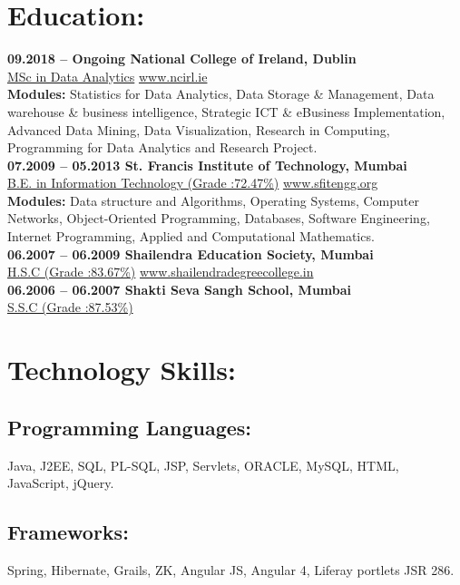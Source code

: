 \documentclass{article}
\begin{document}
\section{Education:}
\textbf{09.2018 – Ongoing \hfill National College of Ireland, Dublin\\}
\underline{MSc in Data Analytics} \hfill \href{www.ncirl.ie}{www.ncirl.ie}\\
\textbf{Modules:} Statistics for Data Analytics, Data Storage \& Management, Data warehouse \& business intelligence, Strategic ICT \& eBusiness Implementation, Advanced Data Mining, Data Visualization, Research in Computing, Programming for Data Analytics and Research Project.\hfill\\
\linebreak
\textbf{07.2009 – 05.2013 \hfill St. Francis Institute of Technology, Mumbai\\}
\underline{B.E. in Information Technology (Grade :72.47\%)} \hfill \href{www.sfitengg.org}{www.sfitengg.org} \\
\textbf{Modules:} Data structure and Algorithms, Operating Systems, Computer Networks, Object-Oriented Programming, Databases, Software Engineering, Internet Programming, Applied and Computational Mathematics.\hfill\\
\linebreak
\textbf{06.2007 – 06.2009 \hfill Shailendra Education Society, Mumbai \\}
\underline{H.S.C (Grade :83.67\%)} \hfill \href{www.shailendradegreecollege.in}{www.shailendradegreecollege.in} \\
\linebreak
\textbf{06.2006 – 06.2007 \hfill Shakti Seva Sangh School, Mumbai\\}
\underline{S.S.C (Grade :87.53\%)}


\section{Technology Skills:}
\subsection{Programming Languages:}
Java, J2EE, SQL, PL-SQL, JSP, Servlets, ORACLE, MySQL, HTML, JavaScript, jQuery.
\subsection{Frameworks:}
 Spring, Hibernate, Grails, ZK, Angular JS, Angular 4, Liferay portlets JSR 286.
\end{document}
